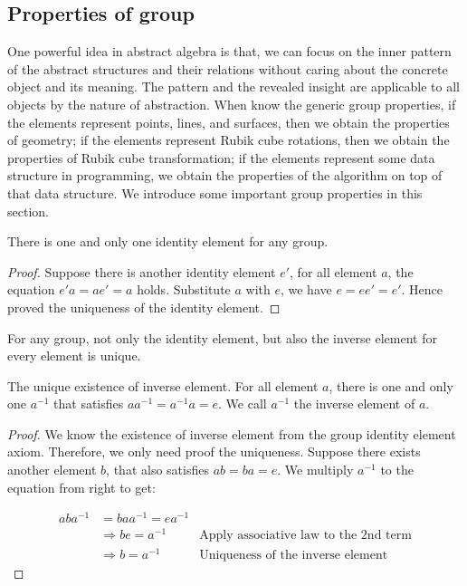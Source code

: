 \documentclass[b5paper]{article}
\begin{document}
\subsection{Properties of group}

One powerful idea in abstract algebra is that, we can focus on the inner pattern of the abstract structures and their relations without caring about the concrete object and its meaning. The pattern and the revealed insight are applicable to all objects by the nature of abstraction. When know the generic group properties, if the elements represent points, lines, and surfaces, then we obtain the properties of geometry; if the elements represent Rubik cube rotations, then we obtain the properties of Rubik cube transformation; if the elements represent some data structure in programming, we obtain the properties of the algorithm on top of that data structure. We introduce some important group properties in this section.

\begin{theorem}
There is one and only one identity element for any group.
\end{theorem}

\begin{proof}
Suppose there is another identity element $e'$, for all element $a$, the equation $e'a = ae' = a$ holds. Substitute $a$ with $e$, we have $e = ee'= e'$. Hence proved the uniqueness of the identity element.
\end{proof}

For any group, not only the identity element, but also the inverse element for every element is unique.

\begin{theorem}
The unique existence of inverse element. For all element $a$, there is one and only one $a^{-1}$ that satisfies $aa^{-1} = a^{-1}a = e$. We call $a^{-1}$ the inverse element of $a$.
\end{theorem}

\begin{proof}
We know the existence of inverse element from the group identity element axiom. Therefore, we only need proof the uniqueness. Suppose there exists another element $b$, that also satisfies $ab = ba = e$. We multiply $a^{-1}$ to the equation from right to get:

\[
\begin{array}{rll}
aba^{-1} & = baa^{-1} = ea^{-1} & \\
& \Rightarrow be = a^{-1} & \text{Apply associative law to the 2nd term} \\
& \Rightarrow b = a^{-1} & \text{Uniqueness of the inverse element}
\end{array}
\]
\end{proof}
\end{document}
